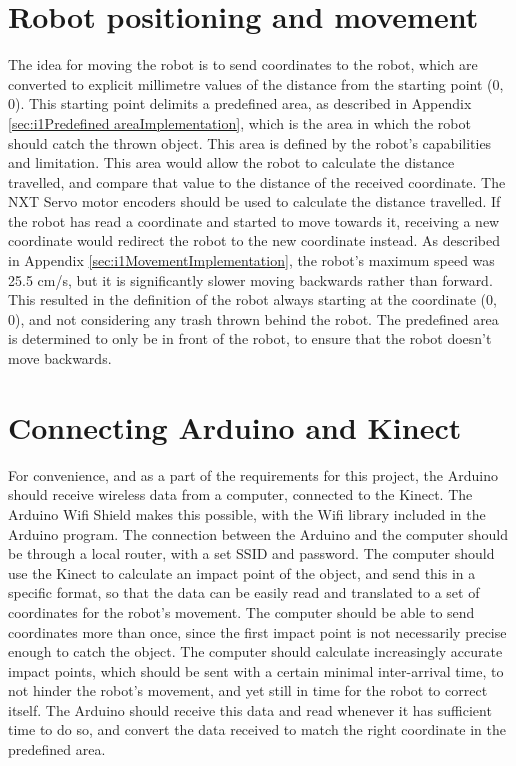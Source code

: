 \section{Robot positioning and movement}
\label{sec:Robot positioning and movement}
The idea for moving the robot is to send coordinates to the robot, which are converted to explicit millimetre values of the distance from the starting point (0, 0). This starting point delimits a predefined area, as described in Appendix \ref{sec:i1Predefined areaImplementation}, which is the area in which the robot should catch the thrown object. This area is defined by the robot’s capabilities and limitation. This area would allow the robot to calculate the distance travelled, and compare that value to the distance of the received coordinate. The NXT Servo motor encoders should be used to calculate the distance travelled. \newline
If the robot has read a coordinate and started to move towards it, receiving a new coordinate would redirect the robot to the new coordinate instead. As described in Appendix \ref{sec:i1MovementImplementation}, the robot’s maximum speed was 25.5 cm/s, but it is significantly slower moving backwards rather than forward. This resulted in the definition of the robot always starting at the coordinate (0, 0), and not considering any trash thrown behind the robot. The predefined area is determined to only be in front of the robot, to ensure that the robot doesn't move backwards. 


\section{Connecting Arduino and Kinect}
\label{sec:Connecting Arduino and Kinect}
For convenience, and as a part of the requirements for this project, the Arduino should receive wireless data from a computer, connected to the Kinect. The Arduino Wifi Shield makes this possible, with the Wifi library included in the Arduino program. \newline
The connection between the Arduino and the computer should be through a local router, with a set SSID and password. The computer should use the Kinect to calculate an impact point of the object, and send this in a specific format, so that the data can be easily read and translated to a set of coordinates for the robot’s movement. The computer should be able to send coordinates more than once, since the first impact point is not necessarily precise enough to catch the object. The computer should calculate increasingly accurate impact points, which should be sent with a certain minimal inter-arrival time, to not hinder the robot’s movement, and yet still in time for the robot to correct itself. \newline
The Arduino should receive this data and read whenever it has sufficient time to do so, and convert the data received to match the right coordinate in the predefined area. 


